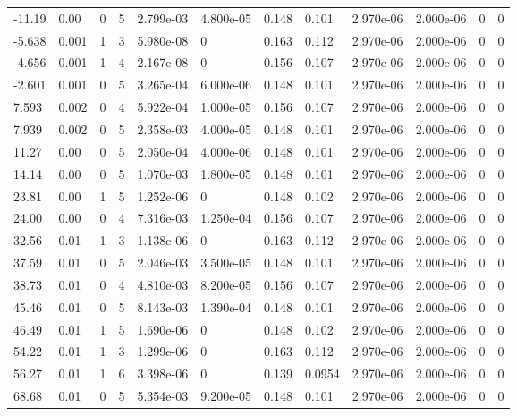 \documentclass[preview]{standalone}
\begin{document}
{{\begin{tabular}{L{1.2cm}C{1.2cm} C{0.3cm}C{0.5cm} C{1.4cm}C{1.4cm} C{1.4cm}C{1.4cm} C{1.6cm}C{1.6cm} C{1.6cm}C{1.6cm}}
  -11.19  &  0.00  & 0     &  5 &  2.799e-03  & 4.800e-05  &  0.148&   0.101& 2.970e-06 & 2.000e-06   &  0 & 0  \\ 
  -5.638  &  0.001  & 1     &  3 &  5.980e-08  & 0  &  0.163&   0.112& 2.970e-06 & 2.000e-06   &  0 & 0  \\ 
  -4.656  &  0.001  & 1     &  4 &  2.167e-08  & 0  &  0.156&   0.107& 2.970e-06 & 2.000e-06   &  0 & 0  \\ 
  -2.601  &  0.001  & 0     &  5 &  3.265e-04  & 6.000e-06  &  0.148&   0.101& 2.970e-06 & 2.000e-06   &  0 & 0  \\ 
  7.593  &  0.002  & 0     &  4 &  5.922e-04  & 1.000e-05  &  0.156&   0.107& 2.970e-06 & 2.000e-06   &  0 & 0  \\ 
  7.939  &  0.002  & 0     &  5 &  2.358e-03  & 4.000e-05  &  0.148&   0.101& 2.970e-06 & 2.000e-06   &  0 & 0  \\ 
  11.27  &  0.00  & 0     &  5 &  2.050e-04  & 4.000e-06  &  0.148&   0.101& 2.970e-06 & 2.000e-06   &  0 & 0  \\ 
  14.14  &  0.00  & 0     &  5 &  1.070e-03  & 1.800e-05  &  0.148&   0.101& 2.970e-06 & 2.000e-06   &  0 & 0  \\ 
  23.81  &  0.00  & 1     &  5 &  1.252e-06  & 0  &  0.148&   0.102& 2.970e-06 & 2.000e-06   &  0 & 0  \\ 
  24.00  &  0.00  & 0     &  4 &  7.316e-03  & 1.250e-04  &  0.156&   0.107& 2.970e-06 & 2.000e-06   &  0 & 0  \\ 
  32.56  &  0.01  & 1     &  3 &  1.138e-06  & 0  &  0.163&   0.112& 2.970e-06 & 2.000e-06   &  0 & 0  \\ 
  37.59  &  0.01  & 0     &  5 &  2.046e-03  & 3.500e-05  &  0.148&   0.101& 2.970e-06 & 2.000e-06   &  0 & 0  \\ 
  38.73  &  0.01  & 0     &  4 &  4.810e-03  & 8.200e-05  &  0.156&   0.107& 2.970e-06 & 2.000e-06   &  0 & 0  \\ 
  45.46  &  0.01  & 0     &  5 &  8.143e-03  & 1.390e-04  &  0.148&   0.101& 2.970e-06 & 2.000e-06   &  0 & 0  \\ 
  46.49  &  0.01  & 1     &  5 &  1.690e-06  & 0  &  0.148&   0.102& 2.970e-06 & 2.000e-06   &  0 & 0  \\ 
  54.22  &  0.01  & 1     &  3 &  1.299e-06  & 0  &  0.163&   0.112& 2.970e-06 & 2.000e-06   &  0 & 0  \\ 
  56.27  &  0.01  & 1     &  6 &  3.398e-06  & 0  &  0.139&   0.0954& 2.970e-06 & 2.000e-06   &  0 & 0  \\ 
  68.68  &  0.01  & 0     &  5 &  5.354e-03  & 9.200e-05  &  0.148&   0.101& 2.970e-06 & 2.000e-06   &  0 & 0  \\ 

\end{tabular}}}
\end{document}

